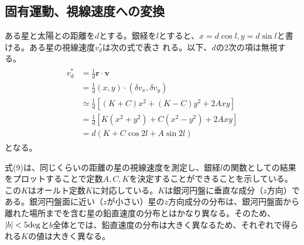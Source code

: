 \subsection{固有運動、視線速度への変換}
ある星と太陽との距離を$d$とする。銀経を$l$とすると、$x = d\cos l,y = d \sin l$と書ける。ある星の視線速度$v^*_d$は次の式で表さ
れる。以下、$d$の2次の項は無視する。
\begin{align}
\begin{aligned}
	v^*_d &= \frac{1}{d} {\bm r} \cdot {\bm v} \\
	      &= \frac{1}{d} (x,y) \cdot (\delta v_x, \delta v_y) \\
	      &\simeq \frac{1}{d} [(K+C)x^2 + (K-C)y^2 + 2Axy] \\
	      &= \frac{1}{d} [K(x^2 + y^2) + C(x^2 - y^2) + 2Axy] \\
	      &= d(K + C\cos2l + A\sin2l)
\end{aligned}
\end{align}
となる。

式(9)は、同じくらいの距離の星の視線速度を測定し、銀経$l$の関数としての結果をプロットすることで定数$A, C, K$を決定することができることを示している。この$K$はオールト定数$K$に対応している。$K$は銀河円盤に垂直な成分（$z$方向）である。銀河円盤面に近い（$z$が小さい）星の$z$方向成分の分布は、銀河円盤面から離れた場所までを含む星の鉛直速度の分布とはかなり異なる。そのため、$|b|<5\rm{deg}$と$b$全体とでは、鉛直速度の分布は大きく異なるため、それぞれで得られる$K$の値は大きく異なる。
\vspace{40pt}

